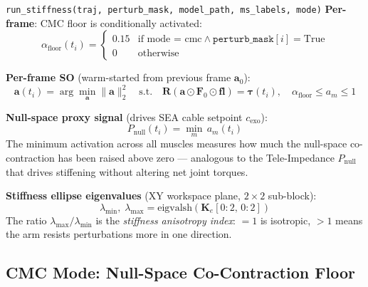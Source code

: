 \documentclass[11pt,a4paper]{article}
\newcommand{\bR}{\bm{R}}
\newcommand{\ba}{\bm{a}}
\newcommand{\bF}{\bm{F}}
\newcommand{\btau}{\bm{\tau}}
\begin{document}
\begin{eqbox}{\texttt{run\_stiffness(traj, perturb\_mask, model\_path, ms\_labels, mode)}}
\textbf{Per-frame}: CMC floor is conditionally activated:
\begin{equation}
\alpha_\text{floor}(t_i) = \begin{cases}
  0.15 & \text{if mode = cmc} \wedge \texttt{perturb\_mask}[i] = \mathrm{True}\\
  0    & \text{otherwise}
\end{cases}
\end{equation}

\textbf{Per-frame SO} (warm-started from previous frame $\ba_0$):
\begin{equation}
\ba(t_i) = \arg\min_{\ba}\|\ba\|_2^2 \quad \text{s.t.} \quad
\bR(\ba\odot\bF_0\odot\bm{fl}) = \btau(t_i),
\quad \alpha_\text{floor} \leq a_m \leq 1
\end{equation}

\textbf{Null-space proxy signal} (drives SEA cable setpoint $c_\text{exo}$):
\begin{equation}
P_\text{null}(t_i) = \min_{m}\, a_m(t_i)
\end{equation}
The minimum activation across all muscles measures how much the null-space
co-contraction has been raised above zero — analogous to the Tele-Impedance
$P_\text{null}$ that drives stiffening without altering net joint torques.

\textbf{Stiffness ellipse eigenvalues} (XY workspace plane, $2\times2$ sub-block):
\begin{equation}
\lambda_{\min},\;\lambda_{\max} = \mathrm{eigvalsh}\!\left(\bm{K}_e[0:2,\,0:2]\right)
\end{equation}
The ratio $\lambda_{\max}/\lambda_{\min}$ is the \emph{stiffness anisotropy index}:
$=1$ is isotropic, $>1$ means the arm resists perturbations more in one direction.
\end{eqbox}

\subsection{CMC Mode: Null-Space Co-Contraction Floor}
\end{document}
